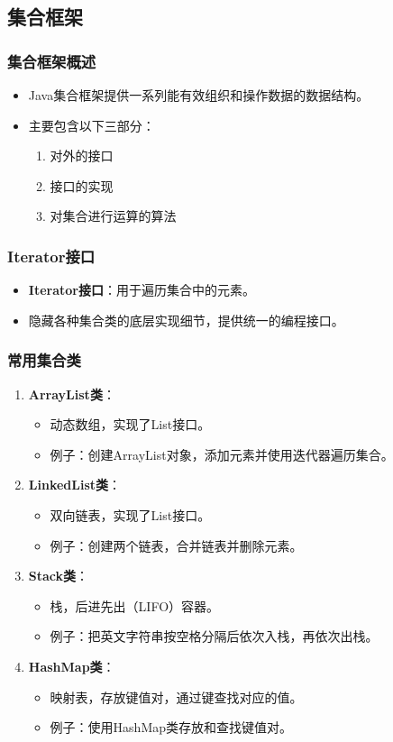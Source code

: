 \documentclass[a4paper, 10pt]{ctexart}
\begin{document}
\subsection{集合框架}
\subsubsection{集合框架概述}
\begin{itemize}
  \item Java集合框架提供一系列能有效组织和操作数据的数据结构。
  \item 主要包含以下三部分：
  \begin{enumerate}
    \item 对外的接口
    \item 接口的实现
    \item 对集合进行运算的算法
  \end{enumerate}
\end{itemize}

\subsubsection{Iterator接口}
\begin{itemize}
  \item \textbf{Iterator接口}：用于遍历集合中的元素。
  \item 隐藏各种集合类的底层实现细节，提供统一的编程接口。
\end{itemize}

\subsubsection{常用集合类}
\begin{enumerate}
  \item \textbf{ArrayList类}：
  \begin{itemize}
    \item 动态数组，实现了List接口。
    \item 例子：创建ArrayList对象，添加元素并使用迭代器遍历集合。
  \end{itemize}
  \item \textbf{LinkedList类}：
  \begin{itemize}
    \item 双向链表，实现了List接口。
    \item 例子：创建两个链表，合并链表并删除元素。
  \end{itemize}
  \item \textbf{Stack类}：
  \begin{itemize}
    \item 栈，后进先出（LIFO）容器。
    \item 例子：把英文字符串按空格分隔后依次入栈，再依次出栈。
  \end{itemize}
  \item \textbf{HashMap类}：
  \begin{itemize}
    \item 映射表，存放键值对，通过键查找对应的值。
    \item 例子：使用HashMap类存放和查找键值对。
  \end{itemize}
\end{enumerate}
\end{document}
